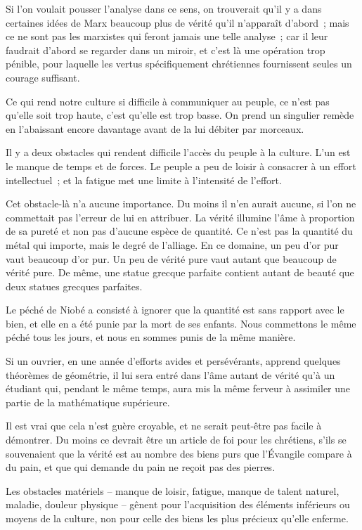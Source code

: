 \documentclass[french,twoside]{book} %
\begin{document}
Si l'on voulait pousser l'analyse dans ce sens, on trouverait qu'il y a dans certaines idées de Marx beaucoup plus de vérité qu'il n'apparaît d'abord ; mais ce ne sont pas les marxistes qui feront jamais une telle analyse ; car il leur faudrait d'abord se regarder dans un miroir, et c'est là une opération trop pénible, pour laquelle les vertus spécifiquement chrétiennes fournissent seules un courage suffisant.\par
Ce qui rend notre culture si difficile à communiquer au peuple, ce n'est pas qu'elle soit trop haute, c'est qu'elle est trop basse. On prend un singulier remède en l'abaissant encore davantage avant de la lui débiter par morceaux.\par
Il y a deux obstacles qui rendent difficile l'accès du peuple à la culture. L'un est le manque de temps et de forces. Le peuple a peu de loisir à consacrer à un effort intellectuel ; et la fatigue met une limite à l'intensité de l'effort.\par
Cet obstacle-là n'a aucune importance. Du moins il n'en aurait aucune, si l'on ne commettait pas l'erreur de lui en attribuer. La vérité illumine l'âme à proportion de sa pureté et non pas d'aucune espèce de quantité. Ce n'est pas la quantité du métal qui importe, mais le degré de l'alliage. En ce domaine, un peu d'or pur vaut beaucoup d'or pur. Un peu de vérité pure vaut autant que beaucoup de vérité pure. De même, une statue grecque parfaite contient autant de beauté que deux statues grecques parfaites.\par
Le péché de Niobé a consisté à ignorer que la quantité est sans rapport avec le bien, et elle en a été punie par la mort de ses enfants. Nous commettons le même péché tous les jours, et nous en sommes punis de la même manière.\par
Si un ouvrier, en une année d'efforts avides et persévérants, apprend quelques théorèmes de géométrie, il lui sera entré dans l'âme autant de vérité qu'à un étudiant qui, pendant le même temps, aura mis la même ferveur à assimiler une partie de la mathématique supérieure.\par
Il est vrai que cela n'est guère croyable, et ne serait peut-être pas facile à démontrer. Du moins ce devrait être un article de foi pour les chrétiens, s'ils se souvenaient que la vérité est au nombre des biens purs que l'Évangile compare à du pain, et que qui demande du pain ne reçoit pas des pierres.\par
Les obstacles matériels – manque de loisir, fatigue, manque de talent naturel, maladie, douleur physique – gênent pour l'acquisition des éléments inférieurs ou moyens de la culture, non pour celle des biens les plus précieux qu'elle enferme.\par
\end{document}
